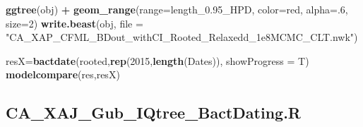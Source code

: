 \documentclass[
]{book}
\newenvironment{Shaded}{\begin{snugshade}}{\end{snugshade}}
\newcommand{\AttributeTok}[1]{\textcolor[rgb]{0.13,0.29,0.53}{#1}}
\newcommand{\DecValTok}[1]{\textcolor[rgb]{0.00,0.00,0.81}{#1}}
\newcommand{\FunctionTok}[1]{\textcolor[rgb]{0.13,0.29,0.53}{\textbf{#1}}}
\newcommand{\NormalTok}[1]{#1}
\newcommand{\OtherTok}[1]{\textcolor[rgb]{0.56,0.35,0.01}{#1}}
\newcommand{\SpecialCharTok}[1]{\textcolor[rgb]{0.81,0.36,0.00}{\textbf{#1}}}
\newcommand{\StringTok}[1]{\textcolor[rgb]{0.31,0.60,0.02}{#1}}
\begin{document}
\begin{Shaded}
\begin{Highlighting}[]
\FunctionTok{ggtree}\NormalTok{(obj) }\SpecialCharTok{+} \FunctionTok{geom\_range}\NormalTok{(}\AttributeTok{range=}\StringTok{\textquotesingle{}length\_0.95\_HPD\textquotesingle{}}\NormalTok{, }\AttributeTok{color=}\StringTok{\textquotesingle{}red\textquotesingle{}}\NormalTok{, }\AttributeTok{alpha=}\NormalTok{.}\DecValTok{6}\NormalTok{, }\AttributeTok{size=}\DecValTok{2}\NormalTok{)}
\FunctionTok{write.beast}\NormalTok{(obj, }\AttributeTok{file =} \StringTok{"CA\_XAP\_CFML\_BDout\_withCI\_Rooted\_Relaxedd\_1e8MCMC\_CLT.nwk"}\NormalTok{)}

\NormalTok{resX}\OtherTok{=}\FunctionTok{bactdate}\NormalTok{(rooted,}\FunctionTok{rep}\NormalTok{(}\DecValTok{2015}\NormalTok{,}\FunctionTok{length}\NormalTok{(Dates)),  }\AttributeTok{showProgress =}\NormalTok{ T)}
\FunctionTok{modelcompare}\NormalTok{(res,resX)}
\end{Highlighting}
\end{Shaded}

\subsection{CA\_XAJ\_Gub\_IQtree\_BactDating.R}\label{BDIQGUB-script}
\end{document}
